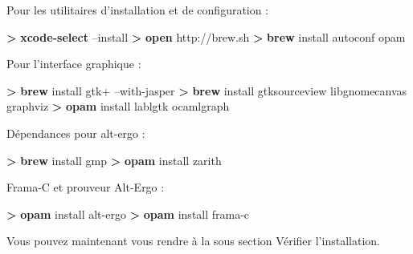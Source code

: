 \documentclass[12pt,francais,]{scrbook}
\newenvironment{Shaded}{}{}
\newcommand{\KeywordTok}[1]{\textcolor[rgb]{0.00,0.44,0.13}{\textbf{{#1}}}}
\newcommand{\NormalTok}[1]{{#1}}
\begin{document}
Pour les utilitaires d'installation et de configuration :

\begin{footnotesize}\begin{Shaded}
\begin{Highlighting}[]
\KeywordTok{>} \KeywordTok{xcode-select} \NormalTok{--install }
\KeywordTok{>} \KeywordTok{open} \NormalTok{http://brew.sh}
\KeywordTok{>} \KeywordTok{brew} \NormalTok{install autoconf opam }
\end{Highlighting}
\end{Shaded}\end{footnotesize}

Pour l'interface graphique :

\begin{footnotesize}\begin{Shaded}
\begin{Highlighting}[]
\KeywordTok{>} \KeywordTok{brew} \NormalTok{install gtk+ --with-jasper}
\KeywordTok{>} \KeywordTok{brew} \NormalTok{install gtksourceview libgnomecanvas graphviz}
\KeywordTok{>} \KeywordTok{opam} \NormalTok{install lablgtk ocamlgraph }
\end{Highlighting}
\end{Shaded}\end{footnotesize}

Dépendances pour alt-ergo :

\begin{footnotesize}\begin{Shaded}
\begin{Highlighting}[]
\KeywordTok{>} \KeywordTok{brew} \NormalTok{install gmp}
\KeywordTok{>} \KeywordTok{opam} \NormalTok{install zarith}
\end{Highlighting}
\end{Shaded}\end{footnotesize}

Frama-C et prouveur Alt-Ergo :

\begin{footnotesize}\begin{Shaded}
\begin{Highlighting}[]
\KeywordTok{>} \KeywordTok{opam} \NormalTok{install alt-ergo}
\KeywordTok{>} \KeywordTok{opam} \NormalTok{install frama-c}
\end{Highlighting}
\end{Shaded}\end{footnotesize}

Vous pouvez maintenant vous rendre à la sous section \og{}Vérifier
l'installation\fg{}.
\end{document}
